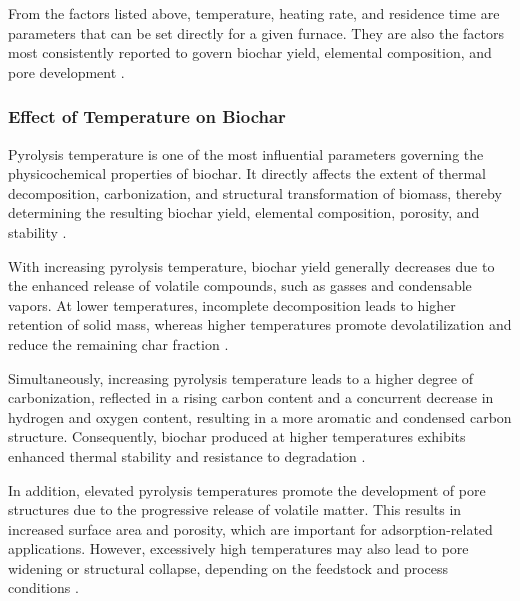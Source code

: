 \vspace{0.3em}

From the factors listed above, temperature, heating rate, and residence time are parameters that can be set directly for a given furnace. They are also the factors most consistently reported to govern biochar yield, elemental composition, and pore development \cite{leng-2018,Pahnila2023}. 



\subsubsection*{Effect of Temperature on Biochar}
\label{subsubsec:Effect of Temperature on Biochar}
Pyrolysis temperature is one of the most influential parameters governing the physicochemical properties of biochar. It directly affects the extent of thermal decomposition, carbonization, and structural transformation of biomass, thereby determining the resulting biochar yield, elemental composition, porosity, and stability \cite{Lataf2022}.

\vspace{0.3em}

With increasing pyrolysis temperature, biochar yield generally decreases due to the enhanced release of volatile compounds, such as gasses and condensable vapors. At lower temperatures, incomplete decomposition leads to higher retention of solid mass, whereas higher temperatures promote devolatilization and reduce the remaining char fraction \cite{zhang-2014}.

\vspace{0.3em}

Simultaneously, increasing pyrolysis temperature leads to a higher degree of carbonization, reflected in a rising carbon content and a concurrent decrease in hydrogen and oxygen content, resulting in a more aromatic and condensed carbon structure. Consequently, biochar produced at higher temperatures exhibits enhanced thermal stability and resistance to degradation \cite{zhang-2014,zhang-2022,224pyrolysistemp}.

\vspace{0.3em}

In addition, elevated pyrolysis temperatures promote the development of pore structures due to the progressive release of volatile matter. This results in increased surface area and porosity, which are important for adsorption-related applications. However, excessively high temperatures may also lead to pore widening or structural collapse, depending on the feedstock and process conditions \cite{tomczyk-2020,ghorbani-2022}.

